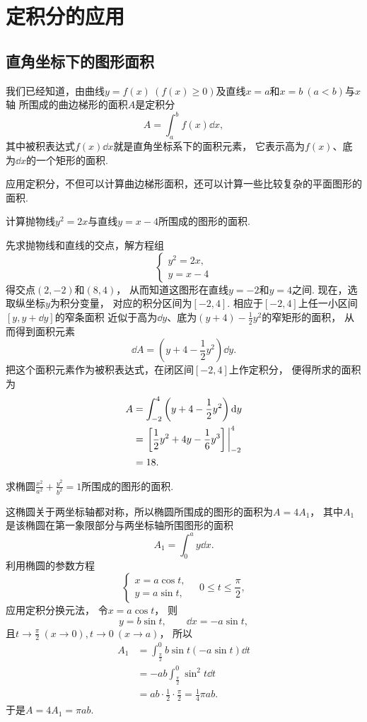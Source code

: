 \section{定积分的应用}
\subsection{直角坐标下的图形面积}
我们已经知道，由曲线\(y=f(x)\ (f(x)\geq0)\)及直线\(x=a\)和\(x=b\ (a<b)\)与\(x\)轴
所围成的曲边梯形的面积\(A\)是定积分\[
	A = \int_a^b f(x) \dd{x},
\]
其中被积表达式\(f(x) \dd{x}\)就是直角坐标系下的面积元素，
它表示高为\(f(x)\)、底为\(\dd{x}\)的一个矩形的面积.

应用定积分，不但可以计算曲边梯形面积，还可以计算一些比较复杂的平面图形的面积.

\begin{example}
计算抛物线\(y^2=2x\)与直线\(y=x-4\)所围成的图形的面积.
\begin{solution}
先求抛物线和直线的交点，解方程组\[
	\left\{ \begin{array}{l}
		y^2=2x, \\
		y=x-4
	\end{array} \right.
\]得交点\((2,-2)\)和\((8,4)\)，
从而知道这图形在直线\(y=-2\)和\(y=4\)之间.
现在，选取纵坐标\(y\)为积分变量，
对应的积分区间为\([-2,4]\).
相应于\([-2,4]\)上任一小区间\([y,y+\dd{y}]\)的窄条面积
近似于高为\(\dd{y}\)、底为\((y+4)-\frac12y^2\)的窄矩形的面积，
从而得到面积元素\[
	\dd{A} = \left(y+4-\frac12y^2\right) \dd{y}.
\]
把这个面积元素作为被积表达式，在闭区间\([-2,4]\)上作定积分，
便得所求的面积为\begin{align*}
	A &= \int_{-2}^4 \left(y+4-\frac12y^2\right) \dd{y} \\
	&= \eval{\left[\frac12y^2+4y-\frac16y^3\right]}_{-2}^4 \\
	&= 18.
\end{align*}
\end{solution}
\end{example}

\begin{example}
求椭圆\(\frac{x^2}{a^2}+\frac{y^2}{b^2}=1\)所围成的图形的面积.
\begin{solution}
这椭圆关于两坐标轴都对称，所以椭圆所围成的图形的面积为\(A=4A_1\)，
其中\(A_1\)是该椭圆在第一象限部分与两坐标轴所围图形的面积\[
	A_1 = \int_0^a y \dd{x}.
\]
利用椭圆的参数方程\[
	\left\{ \begin{array}{l}
		x = a \cos t, \\
		y = a \sin t,
	\end{array} \right.
	\quad 0 \leq t \leq \frac\pi2,
\]
应用定积分换元法，
令\(x = a \cos t\)，
则\[
	y = b \sin t, \qquad
	\dd{x} = -a \sin t,
\]
且\(t \to \frac\pi2\ (x\to0),
t \to 0\ (x \to a)\)，
所以\begin{align*}
	A_1 &= \int_{\frac\pi2}^0 b \sin t (-a \sin t) \dd{t} \\
	&= -ab \int_{\frac\pi2}^0 \sin^2t \dd{t} \\
	&= ab \cdot \frac12 \cdot \frac\pi2
	= \frac14 \pi ab.
\end{align*}
于是\(A = 4 A_1 = \pi ab\).
\end{solution}
\end{example}

